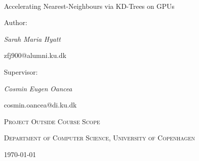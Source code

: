 \documentclass[12pt]{article}
\begin{document}
\begin{titlepage}
 \centering
 {\scshape\large ~~ \par}
 \vspace{4cm}  
 {\Huge Accelerating Nearest-Neighbours via KD-Trees on GPUs \par} %
 \vspace{2.5cm}
 {\scriptsize Author: \par}
 \vspace{0.1cm}
 {\normalsize\itshape Sarah Maria Hyatt \par}
 \vspace{0.2cm}
 {\scriptsize zfj900@alumni.ku.dk \par}
 \vspace{2cm}
 {\scriptsize Supervisor: \par}
 \vspace{0.1cm}
 {\normalsize\itshape Cosmin Eugen Oancea \par}
 \vspace{0.2cm}
 {\scriptsize cosmin.oancea@di.ku.dk \par}
 \vspace{2.5cm}
 \textsc{\small Project Outside Course Scope} \par
 \vspace{0.1cm}
 \textsc{\small Department of Computer Science, University of Copenhagen}\par
 \vfill
 {\small \today\par}
 \vspace{0.3cm}
\end{titlepage}

\tableofcontents













%




\newpage


\end{document}

